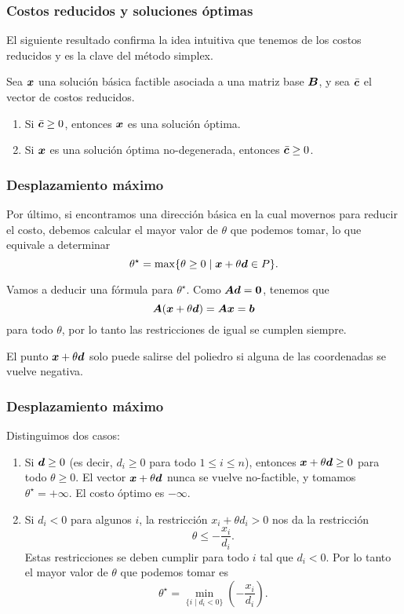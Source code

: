 \documentclass[aspectratio=169,12pt,spanish]{beamer}
\begin{document}
\begin{frame}
\frametitle{Costos reducidos y soluciones óptimas}

El siguiente resultado confirma la idea intuitiva que tenemos de los costos reducidos y es la clave del método simplex.

\vspace{0.5cm}

\begin{theorem}
Sea $\bm{x}$ una solución básica factible asociada a una matriz base $\bm{B}$, y sea $\bar {\bm{c}}$ el vector de costos reducidos.
\begin{enumerate}
\item Si $\bar {\bm{c}} \ge 0$, entonces $\bm{x}$ es una solución óptima.
\item Si $\bm{x}$ es una solución óptima no-degenerada, entonces $\bar {\bm{c}} \ge 0$.
\end{enumerate}
\end{theorem}


\end{frame}


\begin{frame}
\frametitle{Desplazamiento máximo}

Por último, si encontramos una dirección básica en la cual movernos para reducir el costo, debemos calcular el mayor valor de $\theta$ que podemos tomar, lo que equivale a determinar
$$
\theta^\star = \max\{\theta \ge 0 \mid \bm{x} + \theta \bm{d} \in P\}.
$$

Vamos a deducir una fórmula para $\theta^\star$. Como $\bm{A} \bm{d} = \bm{0}$, tenemos que
$$
\bm{A} (\bm{x} + \theta \bm{d}) = \bm{A} \bm{x} = \bm{b}
$$
para todo $\theta$, por lo tanto las restricciones de igual se cumplen siempre. 

El punto $\bm{x} + \theta \bm{d}$ solo puede salirse del poliedro si alguna de las coordenadas se vuelve negativa.
\end{frame}


\begin{frame}
\frametitle{Desplazamiento máximo}

Distinguimos dos casos:

\begin{enumerate}
\item Si $\bm{d} \ge 0$ (es decir, $d_i \ge 0$ para todo $1 \le i \le n$), entonces $\bm{x} + \theta \bm{d} \ge 0$ para todo $\theta \ge 0$. El vector $\bm{x} + \theta \bm{d}$ nunca se vuelve no-factible, y tomamos $\theta^\star = +\infty$. El costo óptimo es $-\infty$.

\item Si $d_i < 0$ para algunos $i$, la restricción $x_i + \theta d_i > 0$ nos da la restricción
$$
\theta \le -\frac{x_i}{d_i}.
$$
Estas restricciones se deben cumplir para todo $i$ tal que $d_i < 0$. Por lo tanto el mayor valor de $\theta$ que podemos tomar es
$$
\theta^\star = \min_{\{i \mid d_i < 0 \}}\left(-\frac{x_i}{d_i}\right).
$$
\end{enumerate}

\end{frame}
\end{document}

